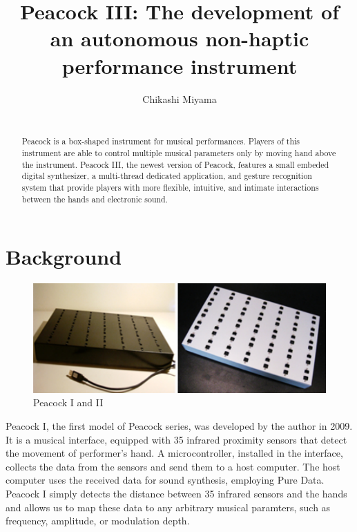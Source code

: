 \documentclass{nime-alternate}
\begin{document}
\title{Peacock III: The development of an autonomous non-haptic performance instrument}
\author{
\alignauthor
Chikashi Miyama\\
       \\
}

\maketitle
\begin{abstract}
Peacock is a box-shaped instrument for musical performances. Players of this instrument are able to control multiple musical parameters only by moving hand above the instrument. Peacock III, the newest version of Peacock, features a small embeded digital synthesizer, a multi-thread dedicated application, and gesture recognition system that provide players with more flexible, intuitive, and intimate interactions between the hands and electronic sound. 
\end{abstract}

\section{Background}

\begin{figure}[htbp]
       \begin{center}
              \includegraphics[scale = 0.55]{Peacocks.pdf}
       \end{center}
       \caption{Peacock I and II}
       \label{fig:old_peacock}
\end{figure}

Peacock I, the first model of Peacock series, was developed by the author in 2009\cite{miyama:peacock}. It is a musical interface, equipped with 35 infrared proximity sensors that detect the movement of performer's hand. A microcontroller, installed in the interface, collects the data from the sensors and send them to a host computer. The host computer uses the received data for sound synthesis, employing Pure Data\cite{Pd}. Peacock I simply detects the distance between 35 infrared sensors and the hands and allows us to map these data to any arbitrary musical paramters, such as frequency, amplitude, or modulation depth.
\end{document}
